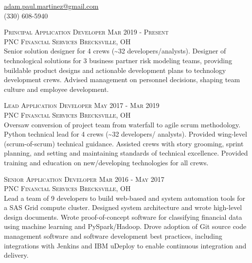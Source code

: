 \documentclass[letterpaper, 11pt]{article} %
\begin{document}
\pagestyle{empty} %



\begin{center}
\href{mailto:adam.paul.martinez@gmail.com}{adam.paul.martinez@gmail.com} \\
(330) 608-5940
\end{center}

\vspace{1em}

\justify

\textsc{Principal Application Developer \hfill Mar 2019 - Present} \\
\textsc{PNC Financial Services \hfill Brecksville, OH} \\
Senior solution designer for 4 crews (\textasciitilde 32 developers/analysts).
Designer of technological solutions for 3 business partner risk modeling teams, providing buildable product designs and actionable development plans to technology development crews.
Advised management on personnel decisions, shaping team culture and employee development.

\textsc{Lead Application Developer \hfill May 2017 - Mar 2019} \\
\textsc{PNC Financial Services \hfill Brecksville, OH} \\
Oversaw conversion of project team from waterfall to agile scrum methodology.
Python technical lead for 4 crews (\textasciitilde 32 developers/ analysts).
Provided wing-level (scrum-of-scrum) technical guidance.
Assisted crews with story grooming, sprint planning, and setting and maintaining standards of technical excellence.
Provided training and education on new/developing technologies for all crews.

\textsc{Senior Application Developer \hfill Mar 2016 - May 2017} \\
\textsc{PNC Financial Services \hfill Brecksville, OH} \\
Lead a team of 9 developers to build web-based and system automation tools for a SAS Grid compute cluster.
Designed system architecture and wrote high-level design documents.
Wrote proof-of-concept software for classifying financial data using machine learning and PySpark/Hadoop.
Drove adoption of Git source code management software and software development best practices, including integrations with Jenkins and IBM uDeploy to enable continuous integration and delivery. 
\end{document}
